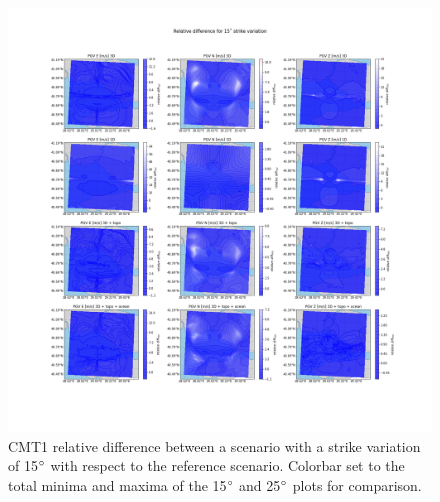 \documentclass[../Text/00main.tex]{subfiles}
\begin{document}
\begin{figure}[!htb]
    \centering
    \includegraphics[width=1.2\linewidth]{images_results/strike_variation_epsilon12_sc1.png}
    \caption{CMT1 relative difference between a scenario with a strike variation of 15$\degree$ with respect to the reference scenario. Colorbar set to the total minima and maxima of the 15$\degree$ and 25$\degree$ plots for comparison.}
    \label{fig:ref_eps12-1}
\end{figure}
\end{document}
